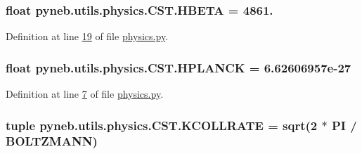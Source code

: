 \hypertarget{classpyneb_1_1utils_1_1physics_1_1_c_s_t_a969cf775617cba19633611eb7fc1b10b}{}
\subsubsection[{H\+B\+E\+T\+A}]{\setlength{\rightskip}{0pt plus 5cm}float pyneb.\+utils.\+physics.\+C\+S\+T.\+H\+B\+E\+T\+A = 4861.\hspace{0.3cm}{\ttfamily [static]}}\label{classpyneb_1_1utils_1_1physics_1_1_c_s_t_a969cf775617cba19633611eb7fc1b10b}


Definition at line \hyperlink{physics_8py_source_l00019}{19} of file \hyperlink{physics_8py_source}{physics.\+py}.

\hypertarget{classpyneb_1_1utils_1_1physics_1_1_c_s_t_a00251eede3f56eadeb766c97f3144c55}{}
\subsubsection[{H\+P\+L\+A\+N\+C\+K}]{\setlength{\rightskip}{0pt plus 5cm}float pyneb.\+utils.\+physics.\+C\+S\+T.\+H\+P\+L\+A\+N\+C\+K = 6.\+62606957e-\/27\hspace{0.3cm}{\ttfamily [static]}}\label{classpyneb_1_1utils_1_1physics_1_1_c_s_t_a00251eede3f56eadeb766c97f3144c55}


Definition at line \hyperlink{physics_8py_source_l00007}{7} of file \hyperlink{physics_8py_source}{physics.\+py}.

\hypertarget{classpyneb_1_1utils_1_1physics_1_1_c_s_t_a7f947f81f3596cb129cec85e6ecb78e7}{}
\subsubsection[{K\+C\+O\+L\+L\+R\+A\+T\+E}]{\setlength{\rightskip}{0pt plus 5cm}tuple pyneb.\+utils.\+physics.\+C\+S\+T.\+K\+C\+O\+L\+L\+R\+A\+T\+E = sqrt(2 $\ast$ {\bf P\+I} / {\bf B\+O\+L\+T\+Z\+M\+A\+N\+N})\hspace{0.3cm}{\ttfamily [static]}}\label{classpyneb_1_1utils_1_1physics_1_1_c_s_t_a7f947f81f3596cb129cec85e6ecb78e7}


